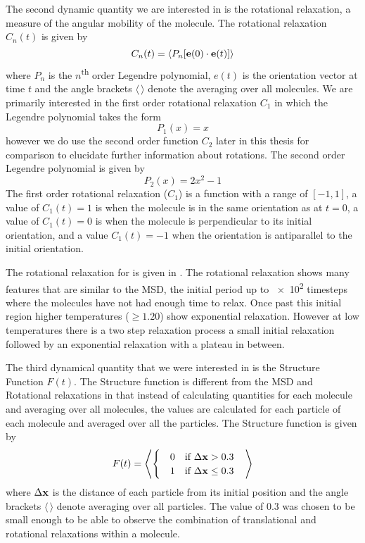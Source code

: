 The second dynamic quantity we are interested in is the rotational relaxation, a measure of the angular mobility of the molecule. The rotational relaxation $C_n(t)$ is given by
\begin{equation}
    C_n(t) = \langle P_n[\mathbf{e}(0) \cdot \mathbf{e}(t)] \rangle
\end{equation}
where $P_n$ is the $n$\textsuperscript{th} order Legendre polynomial, $e(t)$ is the orientation vector at time $t$ and the angle brackets $\langle\,\rangle$ denote the averaging over all molecules. We are primarily interested in the first order rotational relaxation $C_1$ in which the Legendre polynomial takes the form
\begin{equation}
    P_1(x) = x
\end{equation}
however we do use the second order function $C_2$ later in this thesis for comparison to elucidate further information about rotations. The second order Legendre polynomial is given by
\begin{equation}
    P_2(x) = 2x^2 - 1
\end{equation}
The first order rotational relaxation ($C_1$) is a function with a range of $[-1,1]$, a value of $C_1(t)=1$ is when the molecule is in the same orientation as at $t=0$, a value of $C_1(t)=0$ is when the molecule is perpendicular to its initial orientation, and a value $C_1(t)=-1$ when the orientation is antiparallel to the initial orientation.

The rotational relaxation for \sone is given in . The rotational relaxation shows many features that are similar to the MSD, the initial period up to \num{e2} timesteps where the molecules have not had enough time to relax. Once past this initial region higher temperatures ($\geq 1.20$) show exponential relaxation. However at low temperatures there is a two step relaxation process a small initial relaxation followed by an exponential relaxation with a plateau in between.

The third dynamical quantity that we were interested in is the Structure Function $F(t)$. The Structure function is different from the MSD and Rotational relaxations in that instead of calculating quantities for each molecule and averaging over all molecules, the values are calculated for each particle of each molecule and averaged over all the particles. The Structure function is given by
\begin{align}
    F(t) = \left \langle \begin{cases}
        \quad0 &\text{if } \Delta \mathbf{x} > 0.3 \\
        \quad1 &\text{if } \Delta \mathbf{x} \leq 0.3
    \end{cases} \quad \right \rangle
\end{align}
where $\Delta \mathbf{x}$ is the distance of each particle from its initial position and the angle brackets $\langle\,\rangle$ denote averaging over all particles. The value of \num{0.3} was chosen to be small enough to be able to observe the combination of translational and rotational relaxations within a molecule.

